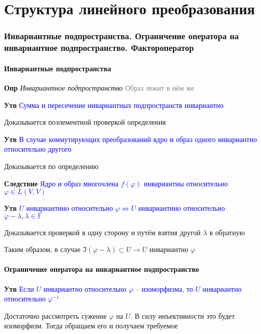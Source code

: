 \documentclass[a4paper, 14pt]{article}
\begin{document}
     \part*{Структура линейного преобразования}

    \section{Инвариантные подпространства.
    Ограничение оператора на инвариантное подпространство.
    Фактороператор}

    \subsection{Инвариантные подпространства}

    \textbf{Опр} \textit{Инвариантное подпространство} \textcolor{gray}{Образ лежит в нём же}

    \textbf{Утв} \textcolor{blue}{Сумма и пересечение инвариантных подпространств инвариантно}

    Доказывается поэлементной проверкой определения

    \textbf{Утв} \textcolor{blue}{В случае коммутирующих преобразований ядро и образ одного инвариантно относительно
    другого}

    Доказывается по определению

    \textbf{Следствие} \textcolor{blue}{Ядро и образ многочлена $f(\varphi)$ инвариантны относительно $\varphi \in L(
    V, V)$}

    \textbf{Утв} \textcolor{blue}{$U$ инвариантнно относительно $\varphi \Leftrightarrow U$ инвариантнно
    относительно $\varphi - \lambda, \lambda \in \mathbb{F}$}

    Доказывается проверкой в одну сторону и путём взятия другой $\lambda$ в обратную

    Таким образом, в случае $\Im (\varphi - \lambda) \subset U \rightarrow U$ инвариантно $\varphi$

    \subsection{Ограничение оператора на инвариантное подпространство}

    \textbf{Утв} \textcolor{blue}{Если $U$ инвариантно относительно $\varphi$ -- изоморфизма, то $U$ инвариантно
    относительно $\varphi^{-1}$}

    Достаточно рассмотреть сужение $\varphi$ на $U$.
    В силу инъективности это будет изоморфизм.
    Тогда обращаем его и получаем требуемое
\end{document}
